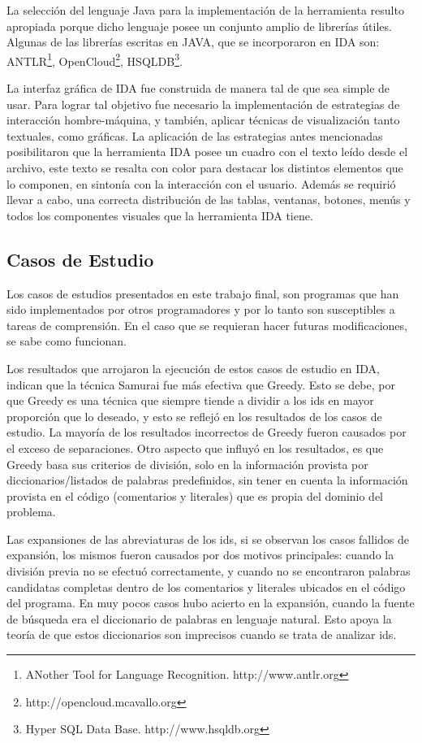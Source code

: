La selección del lenguaje Java para la implementación de la herramienta resulto apropiada porque dicho lenguaje posee un conjunto amplio de librerías útiles. Algunas de las librerías escritas en JAVA, que se incorporaron en IDA son: ANTLR\footnote[1]{ANother Tool for Language Recognition. http://www.antlr.org}, OpenCloud\footnote[2]{http://opencloud.mcavallo.org}, HSQLDB\footnote[3]{Hyper SQL Data Base. http://www.hsqldb.org}.

La interfaz gráfica de IDA fue construida de manera tal de que sea simple de usar. Para lograr tal objetivo fue necesario la implementación de estrategias de interacción hombre-máquina, y también, aplicar técnicas de visualización tanto textuales, como gráficas. La aplicación de las estrategias antes mencionadas posibilitaron que la herramienta IDA posee un cuadro con el texto leído desde el archivo, este texto se resalta con color para destacar los distintos elementos que lo componen, en sintonía con la interacción con el usuario. Además se requirió llevar a cabo, una correcta distribución de las tablas, ventanas, botones, menús y todos los componentes visuales que la herramienta IDA tiene.


\subsection{Casos de Estudio}

Los casos de estudios presentados en este trabajo final, son programas que han sido implementados por otros programadores y por lo tanto son susceptibles a tareas de comprensión. En el caso que se requieran hacer futuras modificaciones, se sabe como funcionan.

Los resultados que arrojaron la ejecución de estos casos de estudio en IDA, indican que la técnica Samurai fue más efectiva que Greedy. Esto se debe, por que Greedy es una técnica que siempre tiende a dividir a los ids en mayor proporción que lo deseado, y esto se reflejó en los resultados de los casos de estudio. La mayoría de los resultados incorrectos de Greedy fueron causados por el exceso de separaciones. Otro aspecto que influyó en los resultados, es que Greedy basa sus criterios de división, solo en la información provista por diccionarios/listados de palabras predefinidos, sin tener en cuenta la información provista en el código (comentarios y literales) que es propia del dominio del problema.

Las expansiones de las abreviaturas de los ids, si se observan los casos fallidos de expansión, los mismos fueron causados por dos motivos principales: cuando la división previa no se efectuó correctamente, y cuando no se encontraron palabras candidatas completas dentro de los comentarios y literales ubicados en el código del programa. En muy pocos casos hubo acierto en la expansión, cuando la fuente de búsqueda era el diccionario de palabras en lenguaje natural. Esto apoya la teoría de que estos diccionarios son imprecisos cuando se trata de analizar ids.

